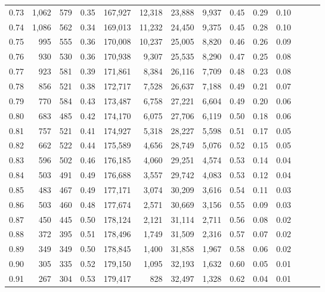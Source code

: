 \begin{tabular}{rrrrrrrrrrrrrr}
0.73 &  1,062 &  579 &  0.35 &  167,927 &   12,318 &  23,888 &   9,937 &  0.45 &  0.29 &      0.10 \\
0.74 &  1,086 &  562 &  0.34 &  169,013 &   11,232 &  24,450 &   9,375 &  0.45 &  0.28 &      0.10 \\
0.75 &    995 &  555 &  0.36 &  170,008 &   10,237 &  25,005 &   8,820 &  0.46 &  0.26 &      0.09 \\
0.76 &    930 &  530 &  0.36 &  170,938 &    9,307 &  25,535 &   8,290 &  0.47 &  0.25 &      0.08 \\
0.77 &    923 &  581 &  0.39 &  171,861 &    8,384 &  26,116 &   7,709 &  0.48 &  0.23 &      0.08 \\
0.78 &    856 &  521 &  0.38 &  172,717 &    7,528 &  26,637 &   7,188 &  0.49 &  0.21 &      0.07 \\
0.79 &    770 &  584 &  0.43 &  173,487 &    6,758 &  27,221 &   6,604 &  0.49 &  0.20 &      0.06 \\
0.80 &    683 &  485 &  0.42 &  174,170 &    6,075 &  27,706 &   6,119 &  0.50 &  0.18 &      0.06 \\
0.81 &    757 &  521 &  0.41 &  174,927 &    5,318 &  28,227 &   5,598 &  0.51 &  0.17 &      0.05 \\
0.82 &    662 &  522 &  0.44 &  175,589 &    4,656 &  28,749 &   5,076 &  0.52 &  0.15 &      0.05 \\
0.83 &    596 &  502 &  0.46 &  176,185 &    4,060 &  29,251 &   4,574 &  0.53 &  0.14 &      0.04 \\
0.84 &    503 &  491 &  0.49 &  176,688 &    3,557 &  29,742 &   4,083 &  0.53 &  0.12 &      0.04 \\
0.85 &    483 &  467 &  0.49 &  177,171 &    3,074 &  30,209 &   3,616 &  0.54 &  0.11 &      0.03 \\
0.86 &    503 &  460 &  0.48 &  177,674 &    2,571 &  30,669 &   3,156 &  0.55 &  0.09 &      0.03 \\
0.87 &    450 &  445 &  0.50 &  178,124 &    2,121 &  31,114 &   2,711 &  0.56 &  0.08 &      0.02 \\
0.88 &    372 &  395 &  0.51 &  178,496 &    1,749 &  31,509 &   2,316 &  0.57 &  0.07 &      0.02 \\
0.89 &    349 &  349 &  0.50 &  178,845 &    1,400 &  31,858 &   1,967 &  0.58 &  0.06 &      0.02 \\
0.90 &    305 &  335 &  0.52 &  179,150 &    1,095 &  32,193 &   1,632 &  0.60 &  0.05 &      0.01 \\
0.91 &    267 &  304 &  0.53 &  179,417 &      828 &  32,497 &   1,328 &  0.62 &  0.04 &      0.01 \\

\end{tabular}
